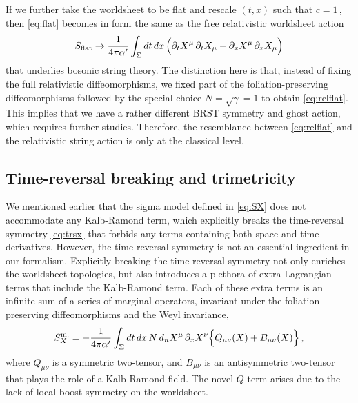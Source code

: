 \documentclass[11pt]{article}
\newcommand{\be}{\begin{equation}}
\newcommand{\ee}{\end{equation}}
\newcommand{\p}{\partial}
\begin{document}
If we further take the worldsheet to be flat and rescale $(t, x)$ such that $c=1$\,, then \eqref{eq:flat} becomes in form the same as the free relativistic worldsheet action 
%
\begin{align} \label{eq:relflat}
	S_\text{flat} \rightarrow \frac{1}{4\pi \alpha'} \int_\Sigma dt \, dx \, \Bigl( \p_t X^\mu \, \p_t X_\mu - \p_x X^\mu \, \p_x X_\mu \Bigr)
\end{align}
%
that underlies bosonic string theory. The distinction here is that, instead of fixing the full relativistic diffeomorphisms, we fixed part of the foliation-preserving diffeomorphisms followed by the special choice $N = \sqrt{\gamma} = 1$ to obtain \eqref{eq:relflat}. This implies that we have a rather different BRST symmetry and ghost action, which requires further studies. Therefore, the resemblance between \eqref{eq:relflat} and the relativistic string action is only at the classical level.

\subsection{Time-reversal breaking and trimetricity} \label{sec:trb}

We mentioned earlier that the sigma model defined in \eqref{eq:SX} does not accommodate any Kalb-Ramond term, which explicitly breaks the time-reversal symmetry \eqref{eq:trsx} that forbids any terms containing both space and time derivatives. However, the time-reversal symmetry is not an essential ingredient in our formalism. Explicitly breaking the time-reversal symmetry not only enriches the worldsheet topologies, but also introduces a plethora of extra Lagrangian terms that include the Kalb-Ramond term. Each of these extra terms is an infinite sum of a series of marginal operators, invariant under the foliation-preserving diffeomorphisms and the Weyl invariance,
%
\be \label{eq:SmX}
	S^\text{m.}_X = - \frac{1}{4\pi\alpha'} \int_{\Sigma} dt \, dx \, N \, d_n X^\mu \, \p_x X^\nu \Bigl\{ Q_{\mu\nu} (X) + B_{\mu\nu} (X) \Bigr\}\,,
\ee
%
where $Q_{\mu\nu}$ is a symmetric two-tensor, and $B_{\mu\nu}$ is an antisymmetric two-tensor that plays the role of a Kalb-Ramond field. The novel $Q$-term arises due to the lack of local boost symmetry on the worldsheet.
\end{document}
